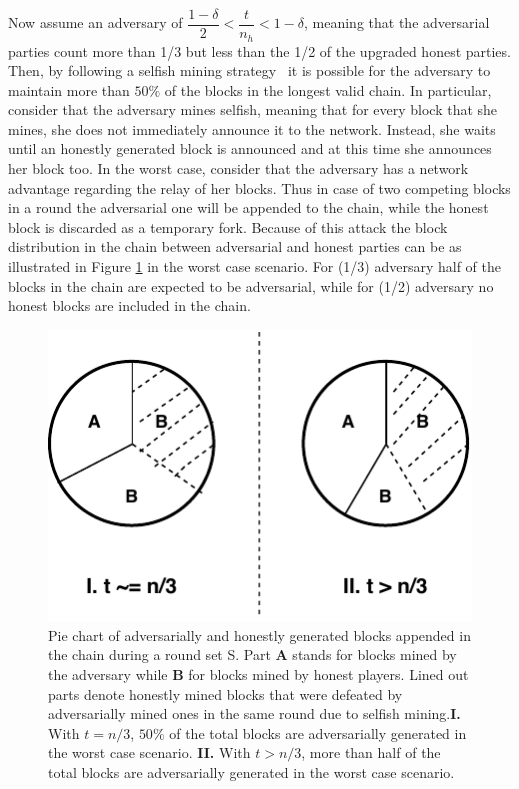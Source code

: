 Now assume an adversary of $ \dfrac{1-\delta}{2} < \dfrac{t}{n_h} < 1-\delta $, meaning that the adversarial parties count more than 1/3 but less than the 1/2 of the upgraded honest parties. Then, by following a selfish mining strategy~\cite{backbone}\cite{selfish} it
is possible for the adversary to maintain more than $50\%$ of the blocks in the longest valid chain. In particular,
consider that the adversary mines selfish, meaning that for every block that she mines,
she does not immediately announce it to the network. Instead, she waits until an honestly generated block is announced and at this time she announces her block too. In the worst case, consider that the adversary has a
network advantage regarding the relay of her blocks. Thus in case of two competing
blocks in a round the adversarial one will be appended to the chain, while the
honest block is discarded as a temporary fork. Because of this attack
the block distribution in the chain between adversarial and honest parties can be as illustrated in Figure
\ref{fig:selfish_mining_pie} in the worst case scenario. For (1/3) adversary half of the blocks in the
chain are expected to be adversarial, while for (1/2) adversary no honest blocks
are included in the chain.

\begin{figure}[h!]
	\begin{center}
		\includegraphics[scale=0.8]{figures/selfish_mining_pie.pdf}
	\end{center}
	\caption{Pie chart of adversarially and honestly generated blocks appended in 
	the chain during a round set S. Part \textbf{A} stands for blocks mined by the
	adversary while \textbf{B} for blocks mined by honest players. Lined out parts
	denote honestly mined blocks that were defeated by adversarially mined ones in
	the same round due to selfish mining.\textbf{I.} With $t = n/3$, $50\%$ of the
	total blocks are adversarially generated in the worst case scenario. \textbf{II.}
	With $t > n/3$, more than half of the total blocks are adversarially generated in
	the worst case scenario.}
	\label{fig:selfish_mining_pie}
\end{figure}


